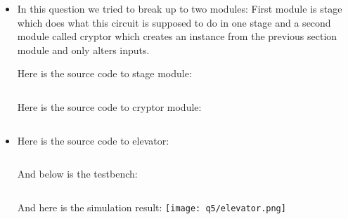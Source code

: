 \documentclass[paper=b4, fontsize=11pt]{scrartcl} %
\numberwithin{equation}{section} %
\numberwithin{figure}{section} %
\numberwithin{table}{section} %
\begin{document}
\begin{itemize}
    \item
        In this question we tried to break up to two modules: First module is
        stage which does what this circuit is supposed to do in one stage and
        a second module called cryptor which creates an instance from the previous
        section module and only alters inputs.

        Here is the source code to stage module:
        \inputminted{vhdl}{q4/src/stage.vhd}

        Here is the source code to cryptor module:
        \inputminted{vhdl}{q4/src/cryptor.vhd}

    \item
        Here is the source code to elevator:

        \inputminted{vhdl}{q5/src/elevator.vhd}

        And below is the testbench:
        \inputminted{vhdl}{q5/test/elevator_tb.vhd}

        And here is the simulation result:
        \texttt{[image: q5/elevator.png]}


\end{itemize}
\end{document}
